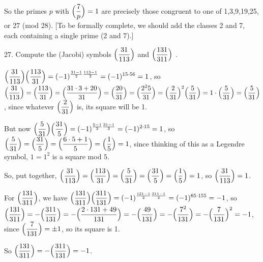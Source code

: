 \msk

So the primes $p$ with $\displaystyle \Big({{7}\over{p}}\Big)=1$ 
are precisely those congruent to one of 1,3,9,19,25, or 27 (mod 28). [To be formally complete, we should add the classes 2 and 7, each
containing a single prime (2 and 7).]

\vfill
\eject

\item{27.} Compute the (Jacobi) symbols $\displaystyle\Big({{31}\over{113}}\Big)$ and 
$\displaystyle\Big({{131}\over{311}}\Big)$ .


\msk

$\displaystyle\Big({{31}\over{113}}\Big)\Big({{113}\over{31}}\Big)=(-1)^{{{31-1}\over{2}}{{113-1}\over{2}}}=(-1)^{15\cdot 56} = 1$,
so $\displaystyle\Big({{31}\over{113}}\Big)=\Big({{113}\over{31}}\Big)=\Big({{31\cdot 3+20}\over{31}}\Big)
=\Big({{20}\over{31}}\Big)=\Big({{2^25}\over{31}}\Big)=\Big({{2}\over{31}}\Big)^2\Big({{5}\over{31}}\Big)=
1\cdot\Big({{5}\over{31}}\Big)=\Big({{5}\over{31}}\Big)$, since whatever $\displaystyle\Big({{2}\over{31}}\Big)$ is,
its square will be 1.

\ssk

But now $\displaystyle\Big({{5}\over{31}}\Big)\Big({{31}\over{5}}\Big)=(-1)^{{{5-1}\over{2}}{{31-1}\over{2}}}=(-1)^{2\cdot 15}=1$,
so $\displaystyle\Big({{5}\over{31}}\Big)=\Big({{31}\over{5}}\Big)=\Big({{6\cdot 5+1}\over{5}}\Big)=\Big({{1}\over{5}}\Big)=1$,
since thinking of this as a Legendre symbol, $1=1^2$ is a square mod $5$.

\ssk

So, put together, $\displaystyle\Big({{31}\over{113}}\Big)=\Big({{113}\over{31}}\Big)=\Big({{5}\over{31}}\Big)=\Big({{31}\over{5}}\Big)
=\Big({{1}\over{5}}\Big)=1$, so $\displaystyle\Big({{31}\over{113}}\Big)=1$.

\bsk

For $\displaystyle\Big({{131}\over{311}}\Big)$, we have $\displaystyle\Big({{131}\over{311}}\Big)\Big({{311}\over{131}}\Big)
=(-1)^{{{131-1}\over{2}}{{311-1}\over{2}}}=(-1)^{65\cdot 155} = -1$, so
$\displaystyle\Big({{131}\over{311}}\Big)=-\Big({{311}\over{131}}\Big)=-\Big({{2\cdot 131+49}\over{131}}\Big)
=-\Big({{49}\over{131}}\Big)=-\Big({{7^2}\over{131}}\Big)=-\Big({{7}\over{131}}\Big)^2=-1$,
since $\displaystyle\Big({{7}\over{131}}\Big)=\pm 1$, so its square is 1.

\ssk

So $\displaystyle\Big({{131}\over{311}}\Big)=-\Big({{311}\over{131}}\Big)=-1$.

